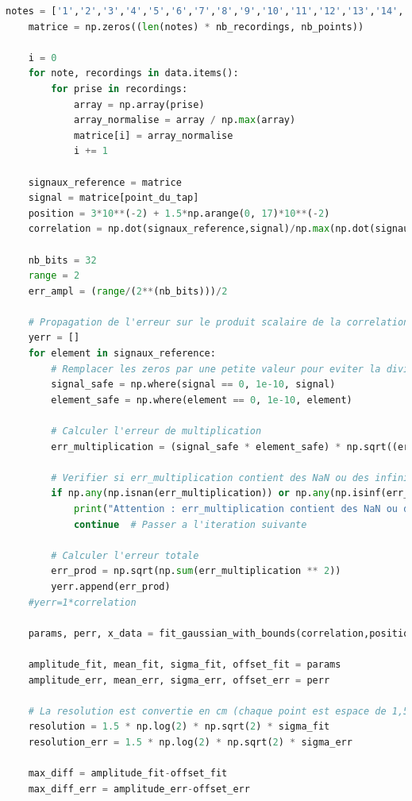 \documentclass[11pt,letterpaper]{article}
\begin{document}
\begin{lstlisting}[language=python]
    notes = ['1','2','3','4','5','6','7','8','9','10','11','12','13','14','15','16','17']
    matrice = np.zeros((len(notes) * nb_recordings, nb_points))

    i = 0
    for note, recordings in data.items():
        for prise in recordings:
            array = np.array(prise)
            array_normalise = array / np.max(array)
            matrice[i] = array_normalise
            i += 1

    signaux_reference = matrice
    signal = matrice[point_du_tap]
    position = 3*10**(-2) + 1.5*np.arange(0, 17)*10**(-2)
    correlation = np.dot(signaux_reference,signal)/np.max(np.dot(signaux_reference,signal))

    nb_bits = 32
    range = 2
    err_ampl = (range/(2**(nb_bits)))/2

    # Propagation de l'erreur sur le produit scalaire de la correlation
    yerr = []
    for element in signaux_reference:
        # Remplacer les zeros par une petite valeur pour eviter la division par zero
        signal_safe = np.where(signal == 0, 1e-10, signal)
        element_safe = np.where(element == 0, 1e-10, element)

        # Calculer l'erreur de multiplication
        err_multiplication = (signal_safe * element_safe) * np.sqrt((err_ampl / signal_safe) ** 2 + (err_ampl / element_safe) ** 2)

        # Verifier si err_multiplication contient des NaN ou des infinis
        if np.any(np.isnan(err_multiplication)) or np.any(np.isinf(err_multiplication)):
            print("Attention : err_multiplication contient des NaN ou des infinis.")
            continue  # Passer a l'iteration suivante

        # Calculer l'erreur totale
        err_prod = np.sqrt(np.sum(err_multiplication ** 2))
        yerr.append(err_prod)
    #yerr=1*correlation

    params, perr, x_data = fit_gaussian_with_bounds(correlation,position, yerr)
    
    amplitude_fit, mean_fit, sigma_fit, offset_fit = params
    amplitude_err, mean_err, sigma_err, offset_err = perr

    # La resolution est convertie en cm (chaque point est espace de 1,5 cm)
    resolution = 1.5 * np.log(2) * np.sqrt(2) * sigma_fit
    resolution_err = 1.5 * np.log(2) * np.sqrt(2) * sigma_err

    max_diff = amplitude_fit-offset_fit
    max_diff_err = amplitude_err-offset_err


\end{lstlisting}
\end{document}
